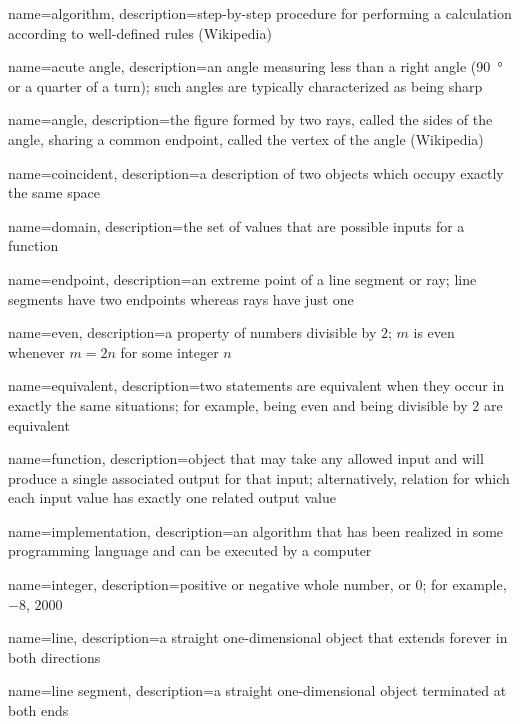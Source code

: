 {
  name=algorithm,
  description={step-by-step procedure for performing a calculation
  according to well-defined rules (Wikipedia)}
}

{
  name=acute angle,
  description={an angle measuring less than a right angle (\SI{90}{\degree} or a
  quarter of a turn); such angles are typically characterized as being sharp}
}

{
  name=angle,
  description={the figure formed by two rays, called the sides of the angle,
  sharing a common endpoint, called the vertex of the angle (Wikipedia)}
}

{
  name=coincident,
  description={a description of two objects which occupy exactly the same space}
}

{
  name=domain,
  description={the set of values that are possible inputs for a function}
}

{
  name=endpoint,
  description={an extreme point of a line segment or ray; line segments have two
  endpoints whereas rays have just one}
}

{
  name=even,
  description={a property of numbers divisible by \(2\); \(m\) is even whenever
  \(m=2n\) for some integer \(n\)}
}

{
  name=equivalent,
  description={two statements are equivalent when they occur in exactly the
  same situations; for example, being even and being divisible by \(2\) are
  equivalent}
}

{
  name=function,
  description={object that may take any allowed input and will produce a
  single associated output for that input; alternatively, relation for
  which each input value has exactly one related output value}
}

{
  name=implementation,
  description={an algorithm that has been realized in some programming
  language and can be executed by a computer}
}

{
  name=integer,
  description={positive or negative whole number, or $0$; for example,
  $-8$, $2000$}
}

{
  name=line,
  description={a straight one-dimensional object that extends forever in both
  directions}
}

{
  name=line segment,
  description={a straight one-dimensional object terminated at both ends}
}

